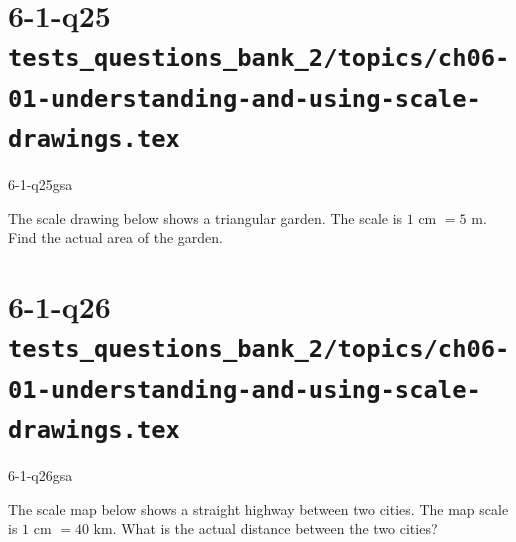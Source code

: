\documentclass[12pt, fleqn, openany]{studyGuide}
\begin{document}
\newpage
\section*{6-1-q25 \hfill \normalsize\texttt{tests\_questions\_bank\_2/topics/ch06-01-understanding-and-using-scale-drawings.tex}}
\begin{practiceQuestion}{6-1-q25}{gsa}
\begin{questionText}
The scale drawing below shows a triangular garden. The scale is $1$ cm $= 5$ m. Find the actual area of the garden.

\begin{center}
\end{center}
\end{questionText}
\end{practiceQuestion}

\newpage
\section*{6-1-q26 \hfill \normalsize\texttt{tests\_questions\_bank\_2/topics/ch06-01-understanding-and-using-scale-drawings.tex}}
\begin{practiceQuestion}{6-1-q26}{gsa}
\begin{questionText}
The scale map below shows a straight highway between two cities. The map scale is $1$ cm $= 40$ km. What is the actual distance between the two cities?

\begin{center}
\end{center}
\end{questionText}
\end{practiceQuestion}
\end{document}
